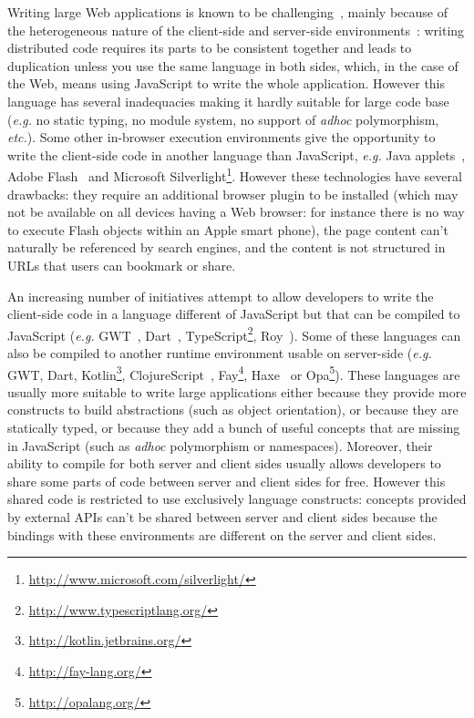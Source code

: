 \documentclass[american,english,runningheads]{llncs}
\newcommand{\eg}{\emph{e.g.}}
\newcommand{\etc}{\emph{etc.}}
\begin{document}
Writing large Web applications is known to be challenging~\cite{Mikkonen08_SpaghettiJs,Preciado05_RIAMethodologyNecessity}, mainly because of the heterogeneous nature of the client-side and server-side environments~\cite{Echeverria09_RIA,Kuuskeri09_PartitioningClientServer}: writing distributed code requires its parts to be consistent together and leads to duplication unless you use the same language in both sides, which, in the case of the Web, means using JavaScript to write the whole application. However this language has several inadequacies making it hardly suitable for large code base (\eg{} no static typing, no module system, no support of \emph{adhoc} polymorphism, \etc). Some other in-browser execution environments give the opportunity to write the client-side code in another language than JavaScript, \eg{} Java applets~\cite{Anuff96_JavaApplets}, Adobe Flash~\cite{Curtis00_Flash} and Microsoft Silverlight\footnote{\href{http://www.microsoft.com/silverlight/}{http://www.microsoft.com/silverlight/}}. 
However these technologies have several drawbacks: they require an additional browser plugin to be installed (which may not be available on all devices having a Web browser: for instance there is no way to execute Flash objects within an Apple smart phone), the page content can't naturally be referenced by search engines, and the content is not structured in URLs that users can bookmark or share.

An increasing number of initiatives attempt to allow developers to write the client-side code in a language different of JavaScript but that can be compiled to JavaScript (\eg{} GWT~\cite{Chaganti07_GWT}, Dart~\cite{Griffith11_Dart}, TypeScript\footnote{\href{http://www.typescriptlang.org/}{http://www.typescriptlang.org/}}, Roy~\cite{McKenna_Roy}). Some of these languages can also be compiled to another runtime environment usable on server-side (\eg{} GWT, Dart, Kotlin\footnote{\href{http://kotlin.jetbrains.org/}{http://kotlin.jetbrains.org/}}, ClojureScript~\cite{McGranaghan11_ClojureScript}, Fay\footnote{\href{http://fay-lang.org/}{http://fay-lang.org/}}, Haxe~\cite{Cannasse08_HaXe} or Opa\footnote{\href{http://opalang.org/}{http://opalang.org/}}). These languages are usually more suitable to write large applications either because they provide more constructs to build abstractions (such as object orientation), or because they are statically typed, or because they add a bunch of useful concepts that are 
missing in JavaScript (such as \emph{adhoc} polymorphism or namespaces). Moreover, their ability to compile for both server and client sides usually allows developers to share some parts of code between server and client sides for free. However this shared code is restricted to use exclusively language constructs: concepts provided by external APIs can't be shared between server and client sides because the bindings with these environments are different on the server and client sides.
\end{document}
